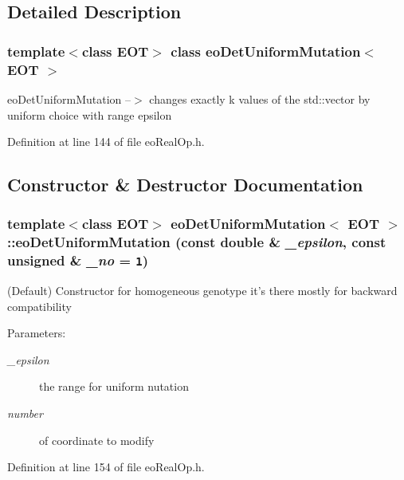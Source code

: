 \subsection{Detailed Description}
\subsubsection*{template$<$class EOT$>$ class eo\-Det\-Uniform\-Mutation$<$ EOT $>$}

eo\-Det\-Uniform\-Mutation --$>$ changes exactly k values of the std::vector by uniform choice with range epsilon 



Definition at line 144 of file eo\-Real\-Op.h.

\subsection{Constructor \& Destructor Documentation}
\subsubsection{\setlength{\rightskip}{0pt plus 5cm}template$<$class EOT$>$ {\bf eo\-Det\-Uniform\-Mutation}$<$ {\bf EOT} $>$::{\bf eo\-Det\-Uniform\-Mutation} (const double \& {\em \_\-epsilon}, const unsigned \& {\em \_\-no} = {\tt 1})\hspace{0.3cm}{\tt  [inline]}}\label{classeo_det_uniform_mutation_a0}


(Default) Constructor for homogeneous genotype it's there mostly for backward compatibility 

\begin{Desc}
\item[Parameters:]
\begin{description}
\item[{\em \_\-epsilon}]the range for uniform nutation \item[{\em number}]of coordinate to modify \end{description}
\end{Desc}


Definition at line 154 of file eo\-Real\-Op.h.
